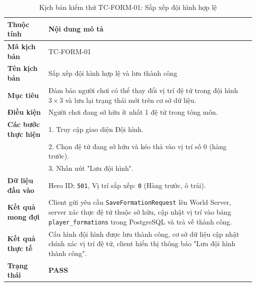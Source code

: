 \documentclass[../Project.tex]{subfiles}
\begin{document}
\begin{table}[H]
\centering
\begin{tabular}{|l|p{10.5cm}|}
\hline
\textbf{Thuộc tính} & \textbf{Nội dung mô tả} \\ \hline
\textbf{Mã kịch bản} & TC-FORM-01 \\ \hline
\textbf{Tên kịch bản} & Sắp xếp đội hình hợp lệ và lưu thành công \\ \hline
\textbf{Mục tiêu} & Đảm bảo người chơi có thể thay đổi vị trí đệ tử trong đội hình $3 \times 3$ và lưu lại trạng thái mới trên cơ sở dữ liệu. \\ \hline
\textbf{Điều kiện} & Người chơi đang sở hữu ít nhất 1 đệ tử trong tông môn. \\ \hline
\textbf{Các bước thực hiện} & 
1. Truy cập giao diện Đội hình. \\
& 2. Chọn đệ tử đang sở hữu và kéo thả vào vị trí số 0 (hàng trước). \\
& 3. Nhấn nút "Lưu đội hình". \\ \hline
\textbf{Dữ liệu đầu vào} & Hero ID: \texttt{501}, Vị trí sắp xếp: \texttt{0} (Hàng trước, ô trái). \\ \hline
\textbf{Kết quả mong đợi} & Client gửi yêu cầu \texttt{SaveFormationRequest} lên World Server, server xác thực đệ tử thuộc sở hữu, cập nhật vị trí vào bảng \texttt{player\_formations} trong PostgreSQL và trả về thành công. \\ \hline
\textbf{Kết quả thực tế} & Cấu hình đội hình được lưu thành công, cơ sở dữ liệu cập nhật chính xác vị trí đệ tử, client hiển thị thông báo "Lưu đội hình thành công". \\ \hline
\textbf{Trạng thái} & \textbf{PASS} \\ \hline
\end{tabular}
\caption{Kịch bản kiểm thử TC-FORM-01: Sắp xếp đội hình hợp lệ}
\label{tab:tc_formation_01}
\end{table}
\end{document}
